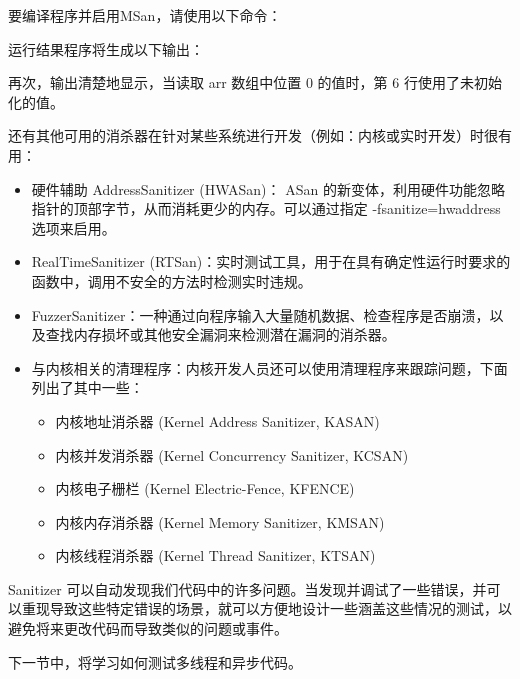 要编译程序并启用MSan，请使用以下命令：


运行结果程序将生成以下输出：


再次，输出清楚地显示，当读取 arr 数组中位置 0 的值时，第 6 行使用了未初始化的值。


还有其他可用的消杀器在针对某些系统进行开发（例如：内核或实时开发）时很有用：

\begin{itemize}
\item
硬件辅助 AddressSanitizer (HWASan)： ASan 的新变体，利用硬件功能忽略指针的顶部字节，从而消耗更少的内存。可以通过指定 -fsanitize=hwaddress 选项来启用。

\item
RealTimeSanitizer (RTSan)：实时测试工具，用于在具有确定性运行时要求的函数中，调用不安全的方法时检测实时违规。

\item
FuzzerSanitizer：一种通过向程序输入大量随机数据、检查程序是否崩溃，以及查找内存损坏或其他安全漏洞来检测潜在漏洞的消杀器。

\item
与内核相关的清理程序：内核开发人员还可以使用清理程序来跟踪问题，下面列出了其中一些：

\begin{itemize}
\item
内核地址消杀器 (Kernel Address Sanitizer, KASAN)

\item
内核并发消杀器 (Kernel Concurrency Sanitizer, KCSAN)

\item
内核电子栅栏 (Kernel Electric-Fence, KFENCE)

\item
内核内存消杀器 (Kernel Memory Sanitizer, KMSAN)

\item
内核线程消杀器 (Kernel Thread Sanitizer, KTSAN)
\end{itemize}
\end{itemize}

Sanitizer 可以自动发现我们代码中的许多问题。当发现并调试了一些错误，并可以重现导致这些特定错误的场景，就可以方便地设计一些涵盖这些情况的测试，以避免将来更改代码而导致类似的问题或事件。

下一节中，将学习如何测试多线程和异步代码。

